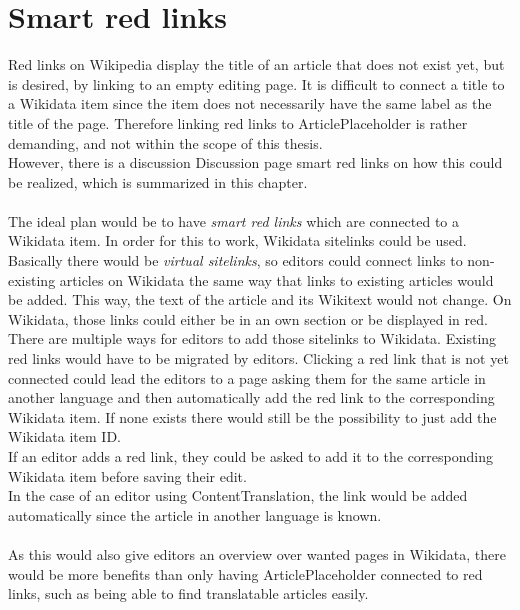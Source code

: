 \section{Smart red links}\label{sec:redLinks}
	Red links on Wikipedia display the title of an article that does not exist yet, but is desired, by linking to an empty editing page. It is difficult to connect a title to a Wikidata item since the item does not necessarily have the same label as the title of the page. Therefore linking red links to ArticlePlaceholder is rather demanding, and not within the scope of this thesis. \\
	However, there is a discussion Discussion page smart red links on how this could be realized, which is summarized in this chapter. \citep{wiki:22} \\
	\\
	The ideal plan would be to have \textit{smart red links} which are connected to a Wikidata item. In order for this to work, Wikidata sitelinks could be used. Basically there would be \textit{virtual sitelinks}, so editors could connect links to non-existing articles on Wikidata the same way that links to existing articles would be added. This way, the text of the article and its Wikitext would not change. On Wikidata, those links could either be in an own section or be displayed in red. \\
	There are multiple ways for editors to add those sitelinks to Wikidata. Existing red links would have to be migrated by editors. Clicking a red link that is not yet connected could lead the editors to a page asking them for the same article in another language and then automatically add the red link to the corresponding Wikidata item. If none exists there would still be the possibility to just add the Wikidata item ID. \\
	If an editor adds a red link, they could be asked to add it to the corresponding Wikidata item before saving their edit. \\
	In the case of an editor using ContentTranslation, the link would be added automatically since the article in another language is known. \\
	\\
	As this would also give editors an overview over wanted pages in Wikidata, there would be more benefits than only having ArticlePlaceholder connected to red links, such as being able to find translatable articles easily.
